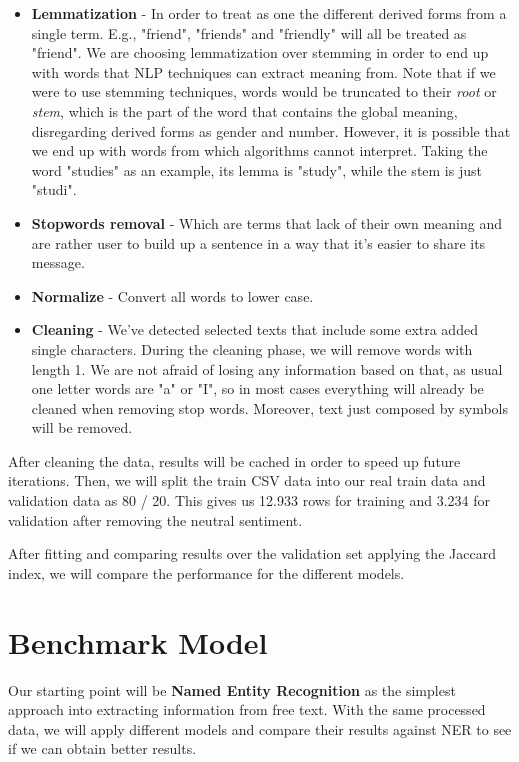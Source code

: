 \documentclass[11pt]{article}
\begin{document}
\begin{itemize}
    \item \textbf{Lemmatization} - In order to treat as one the different derived forms from a single term. E.g., "friend", "friends" and "friendly" will all be treated as "friend". We are choosing lemmatization over stemming in order to end up with words that NLP techniques can extract meaning from. Note that if we were to use stemming techniques, words would be truncated to their \textit{root} or \textit{stem}, which is the part of the word that contains the global meaning, disregarding derived forms as gender and number. However, it is possible that we end up with words from which algorithms cannot interpret. Taking the word "studies" as an example, its lemma is "study", while the stem is just "studi".
    \item \textbf{Stopwords removal} - Which are terms that lack of their own meaning and are rather user to build up a sentence in a way that it's easier to share its message.
    \item \textbf{Normalize} - Convert all words to lower case.
    \item \textbf{Cleaning} - We've detected selected texts that include some extra added single characters. During the cleaning phase, we will remove words with length 1. We are not afraid of losing any information based on that, as usual one letter words are "a" or "I", so in most cases everything will already be cleaned when removing stop words. Moreover, text just composed by symbols will be removed.
\end{itemize}

After cleaning the data, results will be cached in order to speed up future iterations. Then, we will split the train CSV data into our real train data and validation data as 80 / 20. This gives us 12.933 rows for training and 3.234 for validation after removing the neutral sentiment.

After fitting and comparing results over the validation set applying the Jaccard index, we will compare the performance for the different models.

\section{Benchmark Model}

Our starting point will be \textbf{Named Entity Recognition} as the simplest approach into extracting information from free text.
With the same processed data, we will apply different models and compare their results against NER to see if we can obtain better results.
\end{document}
